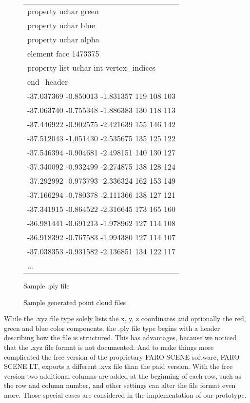 \begin{figure}[h]
\begin{subtable}[b]{0.46\textwidth}
{\begin{tabular}{l}
			property uchar green \\
			property uchar blue \\
			property uchar alpha \\
			element face 1473375 \\
			property list uchar int vertex\_indices \\
			end\_header \\
			-37.037369 -0.850013 -1.831357 119 108 103 \\
			-37.063740 -0.755348 -1.886383 130 118 113 \\
			-37.446922 -0.902575 -2.421639 155 146 142 \\
			-37.512043 -1.051430 -2.535675 135 125 122 \\
			-37.546394 -0.904681 -2.498151 140 130 127 \\
			-37.340092 -0.932499 -2.274875 138 128 124 \\
			-37.292992 -0.973793 -2.336324 162 153 149 \\
			-37.166294 -0.780378 -2.111366 138 127 121 \\
			-37.341915 -0.864522 -2.316645 173 165 160 \\
			-36.981441 -0.691213 -1.978962 127 114 108 \\
			-36.918392 -0.767583 -1.994380 127 114 107 \\
			-37.038353 -0.931582 -2.136851 134 122 117 \\
			...
			
		\end{tabular}}
		\caption{Sample .ply file}
		\label{tab:ply_file}
	\end{subtable}
	\caption{Sample generated point cloud files}
	\label{fig:xyz_ply_file_structure}
\end{figure}

While the .xyz file type solely lists the x, y, z coordinates and optionally the red, green and blue color components, the .ply file type begins with a header describing how the file is structured. This has advantages, because we noticed that the .xyz file format is not documented. And to make things more complicated the free version of the proprietary FARO SCENE software, FARO SCENE LT, exports a different .xyz file than the paid version. With the free version two additional columns are added at the beginning of each row, such as the row and column number, and other settings can alter the file format even more. Those special cases are considered in the implementation of our prototype.


